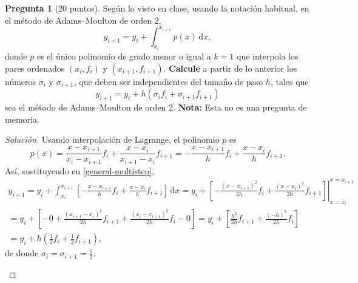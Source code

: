 \documentclass[letterpaper,12pt]{article}
\theoremstyle{definition}
\newtheorem{question}{Pregunta}
\numberwithin{equation}{question}
\newenvironment{solution}{\begin{proof}[Solución]}{\end{proof}}
\begin{document}
\begin{question}[20 puntos]
Según lo visto en clase, usando la notación habitual, en el método de Adams--Moulton de orden 2,
%
\begin{equation}\label{general-multistep}
y_{i+1} = y_i + \int_{x_i}^{x_{i+1}} p(x) \, \mathrm{d} x,
\end{equation}
%
donde $p$ es el único polinomio de grado menor o igual a $k = 1$ que interpola los pares ordenados $(x_i, f_i)$ y $(x_{i+1}, f_{i+1})$.
\textbf{Calcule} a partir de lo anterior los números $\sigma_i$ y $\sigma_{i+1}$, que deben ser independientes del tamaño de paso $h$, tales que
%
\begin{equation*}
y_{i+1} = y_i + h \left(\sigma_i f_i + \sigma_{i+1} f_{i+1}\right)
\end{equation*}
%
sea el método de Adams--Moulton de orden 2.
\textbf{Nota:} Esta no es una pregunta de memoria.
\begin{solution}

Usando interpolación de Lagrange, el polinomio $p$ es
%
\begin{equation*}
p(x) = \frac{x - x_{i+1}}{x_i - x_{i+1}} f_i + \frac{x - x_i}{x_{i+1} - x_i} f_{i+1}
= -\frac{x - x_{i+1}}{h} f_i + \frac{x-x_i}{h} f_{i+1}.
\end{equation*}
%
Así, sustituyendo en \eqref{general-multistep},
%
\begin{multline*}
y_{i+1} = y_i + \int_{x_i}^{x_{i+1}} \left[ -\frac{x - x_{i+1}}{h} f_i + \frac{x-x_i}{h} f_{i+1} \right] \, \mathrm{d} x
= y_i + \left.\left[ -\frac{(x - x_{i+1})^2}{2h} f_i + \frac{(x-x_i)^2}{2h} f_{i+1} \right]\right|_{x=x_i}^{x=x_{i+1}}\\
= y_i + \left[ -0 + \frac{(x_{i+1} - x_i)^2}{2h} f_{i+1} + \frac{(x_i - x_{i+1})^2}{2h} f_i - 0 \right]
= y_i + \left[ \frac{h^2}{2h} f_{i+1} + \frac{(-h)^2}{2h} f_i \right]\\
= y_i + h \left( \frac{1}{2} f_i + \frac{1}{2} f_{i+1} \right),
\end{multline*}
%
de donde $\sigma_i = \sigma_{i+1} = \frac{1}{2}$.

\bigskip
\begin{center}\end{center}

\end{solution}
\end{question}
\end{document}
